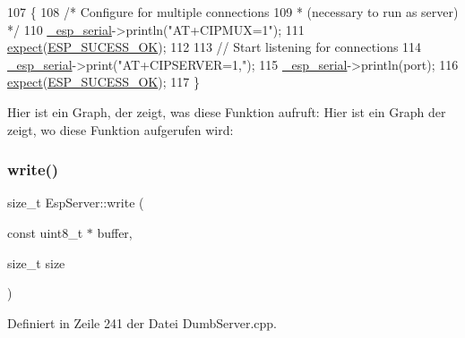 \begin{DoxyCode}
107 \{
108   \textcolor{comment}{/* Configure for multiple connections}
109 \textcolor{comment}{   * (necessary to run as server) */}
110   \hyperlink{class_esp_server_a33166aa92db341d47cdf1776492cca62}{\_esp\_serial}->println(\textcolor{stringliteral}{"AT+CIPMUX=1"});
111   \hyperlink{class_esp_server_a2008f0d315cff00a4bcc1120eeb2dc95}{expect}(\hyperlink{_dumb_server_8cpp_a62497fcb12b1cedd5fdfbc0755508d87}{ESP\_SUCESS\_OK});
112 
113   \textcolor{comment}{// Start listening for connections}
114   \hyperlink{class_esp_server_a33166aa92db341d47cdf1776492cca62}{\_esp\_serial}->print(\textcolor{stringliteral}{"AT+CIPSERVER=1,"});
115   \hyperlink{class_esp_server_a33166aa92db341d47cdf1776492cca62}{\_esp\_serial}->println(port);
116   \hyperlink{class_esp_server_a2008f0d315cff00a4bcc1120eeb2dc95}{expect}(\hyperlink{_dumb_server_8cpp_a62497fcb12b1cedd5fdfbc0755508d87}{ESP\_SUCESS\_OK});
117 \}
\end{DoxyCode}
Hier ist ein Graph, der zeigt, was diese Funktion aufruft\+:
Hier ist ein Graph der zeigt, wo diese Funktion aufgerufen wird\+:
\mbox{\label{class_esp_server_a0756c42343195dd1d1aa2f61c9b095bf}} 
\subsubsection{\texorpdfstring{write()}{write()}\hspace{0.1cm}{\footnotesize\ttfamily [1/6]}}
{\footnotesize\ttfamily size\+\_\+t Esp\+Server\+::write (\begin{DoxyParamCaption}\item[{const uint8\+\_\+t $\ast$}]{buffer,  }\item[{size\+\_\+t}]{size }\end{DoxyParamCaption})\hspace{0.3cm}{\ttfamily [virtual]}}



Definiert in Zeile 241 der Datei Dumb\+Server.\+cpp.



